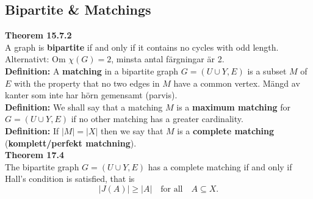 \documentclass{article}
\begin{document}
\begin{multicols}{2}
    \subsection{Bipartite \& Matchings}
    
    
    \textbf{Theorem 15.7.2}\\
    A graph is \textbf{bipartite} if and only if it contains no cycles with odd length. Alternativt: Om $\chi(G) = 2$, minsta antal färgningar är 2.\\
    \newline
    \textbf{Definition:} A \textbf{matching} in a bipartite graph $G = (U \cup Y, E)$ is a subset $M$ of $E$ with the property that no two edges in $M$ have a common vertex. Mängd av kanter som inte har hörn gemensamt (parvis).\\
    \newline
    \textbf{Definition:} We shall say that a matching $M$ is a \textbf{maximum matching} for $G = (U \cup Y, E)$ if no other matching has a greater cardinality.\\
    \newline
    \textbf{Definition:} If $|M|=|X|$ then we say that $M$ is a \textbf{complete matching} (\textbf{komplett/perfekt matchning}). \\
    \newline
    \textbf{Theorem 17.4}\\
    The bipartite graph $G = (U \cup Y, E)$ has a complete matching if and only if Hall's condition is satisfied, that is 
    $$|J(A)| \geq |A| \quad \text{for all} \quad A \subseteq X.$$ 
\end{multicols}
\end{document}
